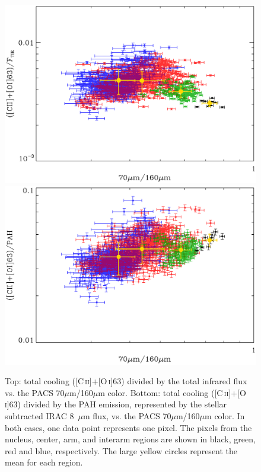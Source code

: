 \begin{figure}
\centering
\includegraphics[width=0.9\columnwidth]{ch3/Figure4a}
\includegraphics[width=0.9\columnwidth]{ch3/Figure4b}
\caption[Heating efficiency as a function of the 70$\mu$m/160$\mu$m color in M51]{Top: total cooling ([C\,\textsc{ii}]+[O\,\textsc{i}]63) divided by the total infrared flux vs. the PACS 70$\mu$m/160$\mu$m color.  Bottom: total cooling ([C\,\textsc{ii}]+[O\,\textsc{i}]63) divided by the PAH emission, represented by the stellar subtracted IRAC 8~$\mu$m flux, vs. the PACS 70$\mu$m/160$\mu$m color.  In both cases, one data point represents one pixel.  The pixels from the nucleus, center, arm, and interarm regions are shown in black, green, red and blue, respectively.  The large yellow circles represent the mean for each region.}
\label{fig:heating_efficiency}
\end{figure}

